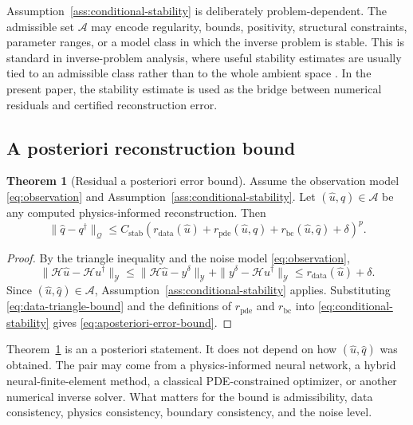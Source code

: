 \documentclass{article}
\numberwithin{equation}{section}
\theoremstyle{definition}
\newtheorem{theorem}{Theorem}
\begin{document}
Assumption~\ref{ass:conditional-stability} is deliberately problem-dependent. The admissible set \(\mathcal A\) may encode regularity, bounds, positivity, structural constraints, parameter ranges, or a model class in which the inverse problem is stable. This is standard in inverse-problem analysis, where useful stability estimates are usually tied to an admissible class rather than to the whole ambient space \cite{Isakov2006,EnglHankeNeubauer1996}. In the present paper, the stability estimate is used as the bridge between numerical residuals and certified reconstruction error.

\subsection{A posteriori reconstruction bound}

\begin{theorem}[Residual a posteriori error bound]
\label{thm:residual-error-bound}
Assume the observation model \eqref{eq:observation} and Assumption~\ref{ass:conditional-stability}. Let \((\widehat u,\widehat q)\in\mathcal A\) be any computed physics-informed reconstruction. Then
\begin{equation}
\|\widehat q-q^\dagger\|_{\mathcal Q}
\le
C_{\mathrm{stab}}
\left(
r_{\mathrm{data}}(\widehat u)
+
r_{\mathrm{pde}}(\widehat u,\widehat q)
+
r_{\mathrm{bc}}(\widehat u,\widehat q)
+
\delta
\right)^p .
\label{eq:aposteriori-error-bound}
\end{equation}
\end{theorem}

\begin{proof}
By the triangle inequality and the noise model \eqref{eq:observation},
\begin{equation}
\|\mathcal H\widehat u-\mathcal H u^\dagger\|_{\mathcal Y}
\le
\|\mathcal H\widehat u-y^\delta\|_{\mathcal Y}
+
\|y^\delta-\mathcal H u^\dagger\|_{\mathcal Y}
\le
r_{\mathrm{data}}(\widehat u)+\delta .
\label{eq:data-triangle-bound}
\end{equation}
Since \((\widehat u,\widehat q)\in\mathcal A\), Assumption~\ref{ass:conditional-stability} applies. Substituting \eqref{eq:data-triangle-bound} and the definitions of \(r_{\mathrm{pde}}\) and \(r_{\mathrm{bc}}\) into \eqref{eq:conditional-stability} gives \eqref{eq:aposteriori-error-bound}.
\end{proof}

Theorem~\ref{thm:residual-error-bound} is an a posteriori statement. It does not depend on how \((\widehat u,\widehat q)\) was obtained. The pair may come from a physics-informed neural network, a hybrid neural-finite-element method, a classical PDE-constrained optimizer, or another numerical inverse solver. What matters for the bound is admissibility, data consistency, physics consistency, boundary consistency, and the noise level.
\end{document}
